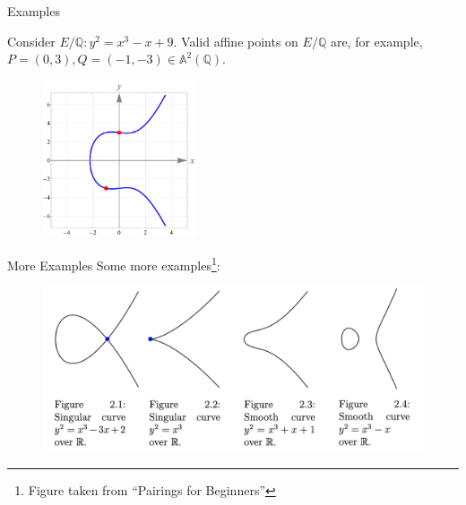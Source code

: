 \documentclass{zkdl-presentation-template}
\begin{document}
    \begin{frame}{Examples}
        \begin{example}
            Consider $E/\mathbb{Q}: y^2=x^3-x+9$. Valid affine points on $E/\mathbb{Q}$ are, for example, $P=(0,3), Q=(-1,-3) \in \mathbb{A}^2(\mathbb{Q})$.
        
            \begin{figure}
                \centering
                \includegraphics[width=0.4\textwidth]{images/lecture_3/ec_illustration_1.pdf}
                \label{fig:ec_1}
            \end{figure}
        \end{example}
    \end{frame}

    \begin{frame}{More Examples}
        Some more examples\footnote{Figure taken from ``Pairings for Beginners''}:
        \begin{figure}
            \centering
            \includegraphics[width=\textwidth]{images/lecture_3/ec_illustration_2.png}
            \label{fig:ec_2}
        \end{figure}
    \end{frame}
    
\end{document}
